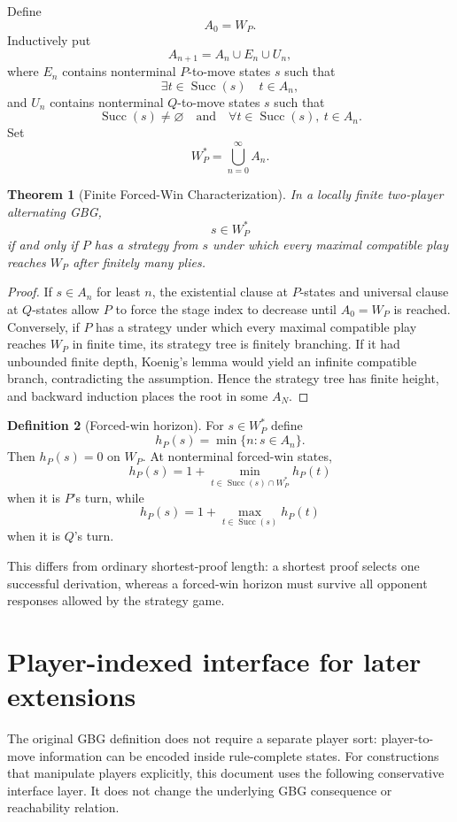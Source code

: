 \documentclass[11pt]{article}
\newtheorem{theorem}{Theorem}[section]
\theoremstyle{definition}
\newtheorem{definition}[theorem]{Definition}
\theoremstyle{remark}
\newcommand{\Succ}{\operatorname{Succ}}
\begin{document}
Define
\[
A_0=W_P.
\]
Inductively put
\[
A_{n+1}=A_n\cup E_n\cup U_n,
\]
where $E_n$ contains nonterminal $P$-to-move states $s$ such that
\[
\exists t\in\Succ(s)\quad t\in A_n,
\]
and $U_n$ contains nonterminal $Q$-to-move states $s$ such that
\[
\Succ(s)\neq\varnothing
\quad\text{and}\quad
\forall t\in\Succ(s),\ t\in A_n.
\]
Set
\[
W_P^*=\bigcup_{n=0}^{\infty}A_n.
\]

\begin{theorem}[Finite Forced-Win Characterization]
In a locally finite two-player alternating GBG,
\[
\boxed{s\in W_P^*}
\]
if and only if $P$ has a strategy from $s$ under which every maximal compatible play reaches $W_P$ after finitely many plies.
\end{theorem}

\begin{proof}
If $s\in A_n$ for least $n$, the existential clause at $P$-states and universal clause at $Q$-states allow $P$ to force the stage index to decrease until $A_0=W_P$ is reached.  Conversely, if $P$ has a strategy under which every maximal compatible play reaches $W_P$ in finite time, its strategy tree is finitely branching.  If it had unbounded finite depth, Koenig's lemma would yield an infinite compatible branch, contradicting the assumption.  Hence the strategy tree has finite height, and backward induction places the root in some $A_N$.
\end{proof}

\begin{definition}[Forced-win horizon]
For $s\in W_P^*$ define
\[
h_P(s)=\min\{n:s\in A_n\}.
\]
Then $h_P(s)=0$ on $W_P$.  At nonterminal forced-win states,
\[
h_P(s)=1+\min_{t\in\Succ(s)\cap W_P^*}h_P(t)
\]
when it is $P$'s turn, while
\[
h_P(s)=1+\max_{t\in\Succ(s)}h_P(t)
\]
when it is $Q$'s turn.
\end{definition}

This differs from ordinary shortest-proof length: a shortest proof selects one successful derivation, whereas a forced-win horizon must survive all opponent responses allowed by the strategy game.

\section{Player-indexed interface for later extensions}

The original GBG definition does not require a separate player sort: player-to-move information can be encoded inside rule-complete states.  For constructions that manipulate players explicitly, this document uses the following conservative interface layer.  It does not change the underlying GBG consequence or reachability relation.
\end{document}
